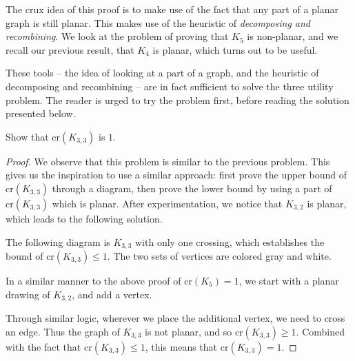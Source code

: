 \documentclass[11pt,paper=letter]{scrartcl}
\newcommand{\crs}[1]{\mathrm{cr}(#1)}
\begin{document}
The crux idea of this proof is to make use of the fact that any part of a planar graph is still planar. This makes use of the heuristic of \emph{decomposing and recombining}. We look at the problem of proving that $K_5$ is non-planar, and we recall our previous result, that $K_4$ is planar, which turns out to be useful.

These tools -- the idea of looking at a part of a graph, and the heuristic of decomposing and recombining -- are in fact sufficient to solve the three utility problem. The reader is urged to try the problem first, before reading the solution presented below. 

\begin{problem}
Show that $\crs{K_{3,3}}$ is $1$.
\end{problem}

\begin{proof}
We observe that this problem is similar to the previous problem. This gives us the inspiration to use a similar approach: first prove the upper bound of $\crs{K_{3,3}}$ through a diagram, then prove the lower bound by using a part of $\crs{K_{3,3}}$ which is planar. After experimentation, we notice that $K_{3,2}$ is planar, which leads to the following solution.

The following diagram is $K_{3,3}$ with only one crossing, which establishes the bound of $\crs{K_{3,3}} \leq 1$. The two sets of vertices are colored gray and white.

\begin{center}
\end{center}

In a similar manner to the above proof of $\crs{K_5} = 1$, we start with a planar drawing of $K_{3,2}$, and add a vertex.

\begin{center}
\end{center}

Through similar logic, wherever we place the additional vertex, we need to cross an edge. Thus the graph of $K_{3, 3}$ is not planar, and so $\crs{K_{3,3}} \geq 1$. Combined with the fact that $\crs{K_{3,3}} \leq 1$, this means that $\crs{K_{3,3}} = 1$.
\end{proof}
\end{document}
